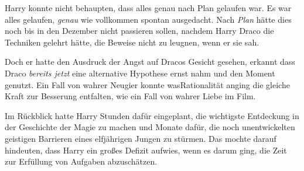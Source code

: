Harry konnte nicht behaupten, dass alles genau nach Plan gelaufen war. Es war alles gelaufen, \emph{genau} wie vollkommen spontan ausgedacht. Nach \emph{Plan} hätte dies noch bis in den Dezember nicht passieren sollen, nachdem Harry Draco die Techniken gelehrt hätte, die Beweise nicht zu leugnen, wenn er sie sah.

Doch er hatte den Ausdruck der Angst auf Dracos Gesicht gesehen, erkannt dass Draco \emph{bereits jetzt} eine alternative Hypothese ernst nahm und den Moment genutzt. Ein Fall von wahrer Neugier konnte wasRationalität anging die gleiche Kraft zur Besserung entfalten, wie ein Fall von wahrer Liebe im Film.

Im Rückblick hatte Harry Stunden dafür eingeplant, die wichtigste Entdeckung in der Geschichte der Magie zu machen und Monate dafür, die noch unentwickelten geistigen Barrieren eines elfjährigen Jungen zu stürmen. Das mochte darauf hindeuten, dass Harry ein großes Defizit aufwies, wenn es darum ging, die Zeit zur Erfüllung von Aufgaben abzuschätzen.

